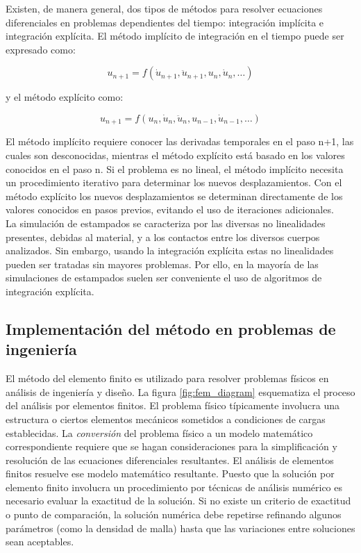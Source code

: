 Existen, de manera general, dos tipos de métodos para resolver ecuaciones diferenciales  
en problemas dependientes del tiempo: integración implícita e integración explícita. El 
método implícito de integración en el tiempo puede ser expresado como: ~\cite{nielsen1997}

\begin{equation}
u_{n+1}=f(\dot{u}_{n+1},\ddot{u}_{n+1},u_n,\dot{u}_n,…)
\end{equation}

y el método explícito como:

\begin{equation}
u_{n+1}=f(u_n,\dot{u}_n,\ddot{u}_n,u_{n-1},\dot{u}_{n-1},…)
\end{equation}

El método implícito requiere conocer las derivadas temporales en el paso n+1, las cuales son desconocidas, 
mientras el método explícito está basado en los valores conocidos en el paso n. Si el problema es no 
lineal, el método implícito necesita un procedimiento iterativo para determinar los nuevos desplazamientos. 
Con el método explícito los nuevos desplazamientos se determinan directamente de los valores conocidos 
en pasos previos, evitando el uso de iteraciones adicionales.~\cite{nielsen1997}\\

La simulación de estampados se caracteriza por las diversas no linealidades presentes, debidas al 
material, y a los contactos entre los diversos cuerpos analizados. Sin embargo, usando la integración 
explícita estas no linealidades pueden ser tratadas sin mayores problemas. Por ello, en la mayoría de 
las simulaciones de estampados suelen ser conveniente el uso de algoritmos de integración explícita.


\subsection{Implementación del método en problemas de ingeniería} \label{subsec:implementacion-fem}

El método del elemento finito es utilizado para resolver problemas físicos en análisis de ingeniería 
y diseño. La figura \ref{fig:fem_diagram} esquematiza el proceso del análisis por elementos finitos.
El problema físico típicamente involucra una estructura o ciertos elementos mecánicos sometidos 
a condiciones de cargas establecidas. La \textit{conversión} del problema físico a un modelo matemático 
correspondiente requiere que se hagan consideraciones para la simplificación y resolución de las 
ecuaciones diferenciales resultantes. El análisis de elementos finitos resuelve ese modelo matemático 
resultante. Puesto que la solución por elemento finito involucra un procedimiento por técnicas de 
análisis numérico es necesario evaluar la exactitud de la solución. Si no existe un criterio de 
exactitud o punto de comparación, la solución numérica debe repetirse refinando algunos parámetros 
(como la densidad de malla) hasta que las variaciones entre soluciones sean aceptables.\\

